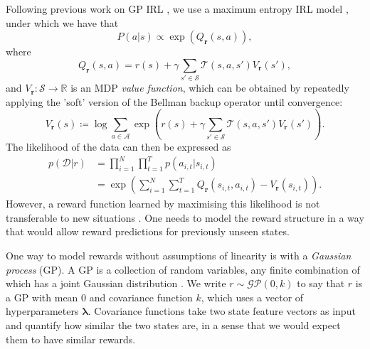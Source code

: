 \documentclass{mpaper}
\newcommand{\V}{V_{\mathbf{r}}}
\begin{document}
Following previous work on GP IRL
\cite{DBLP:conf/nips/LevinePK11,DBLP:conf/uai/JinDAS17}, we use a maximum
entropy IRL model \cite{ziebart2008maximum}, under which we have that
\[ P(a | s) \propto \exp(Q_{\mathbf{r}}(s, a)), \]
where
\[
  Q_{\mathbf{r}}(s, a) = r(s) + \gamma\sum_{s' \in \mathcal{S}}
  \mathcal{T}(s, a, s')\V(s'),
\]
and $\V : \mathcal{S} \to \mathbb{R}$ is an MDP \emph{value function}, which
can be obtained by repeatedly applying the 'soft' version of the Bellman backup
operator until convergence:
\cite{DBLP:conf/nips/LevinePK11,supplementary_material}
\begin{equation} \label{eq:update_rule}
  \V(s) \coloneqq \log \sum_{a \in \mathcal{A}} \exp\left( r(s) + \gamma\sum_{s'
      \in \mathcal{S}} \mathcal{T}(s, a, s')\V(s') \right).
\end{equation}
The likelihood of the data can then be expressed as
\cite{DBLP:conf/uai/JinDAS17,DBLP:conf/nips/LevinePK11}
\begin{equation} \label{pDr}
  \begin{split}
    p(\mathcal{D} | r) &= \prod_{i=1}^N \prod_{t=1}^T p(a_{i,t} | s_{i,t}) \\
    &= \exp\left( \sum_{i=1}^N \sum_{t=1}^T Q_{\mathbf{r}}(s_{i,t}, a_{i,t}) - \V(s_{i,t}) \right).
  \end{split}
\end{equation}
However, a reward function learned by maximising this likelihood is not
transferable to new situations
\cite{DBLP:conf/uai/JinDAS17,DBLP:conf/nips/LevinePK11}. One needs to model the
reward structure in a way that would allow reward predictions for previously
unseen states.

One way to model rewards without assumptions of linearity is with a
\emph{Gaussian process} (GP). A GP is a collection of random variables, any
finite combination of which has a joint Gaussian distribution
\cite{DBLP:books/lib/RasmussenW06}. We write $r \sim \mathcal{GP}(0,
k)$ to say that $r$ is a GP with mean $0$ and covariance function
$k$, which uses a vector of hyperparameters $\bm\lambda$.
Covariance functions take two state feature vectors as input and quantify how
similar the two states are, in a sense that we would expect them to have similar
rewards.
\end{document}
